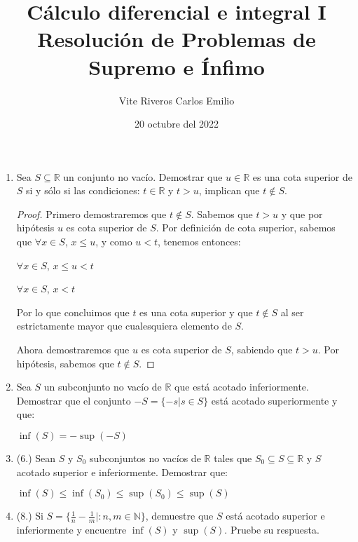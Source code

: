 \documentclass[11pt, a4paper]{article}
\title{Cálculo diferencial e integral I\\Resolución de Problemas de Supremo e Ínfimo}
\author{Vite Riveros Carlos Emilio}
\date{20 octubre del 2022}
\begin{document}
    \maketitle
    \begin{enumerate}
        \item Sea $S \subseteq \mathbb{R}$ un conjunto no vacío. Demostrar que $u \in \mathbb{R}$ es una cota superior de $S$ si y sólo si las
        condiciones: $t \in \mathbb{R}$ y $t > u$, implican que $t \notin S$.

        \begin{proof}
            Primero demostraremos que $t \notin S$. Sabemos que $t > u$ y que por hipótesis $u$ es cota superior de $S$.
            Por definición de cota superior, sabemos que $\forall x \in S$, $x \leq u$, y como $u<t$, tenemos entonces:
            \begin{center}
                $\forall x \in S$, $x\leq u < t$

                $\forall x \in S$, $x < t$
            \end{center}

            Por lo que concluimos que $t$  es una cota superior y que $t \notin S$ al ser estrictamente mayor que cualesquiera elemento de $S$.

            Ahora demostraremos que $u$ es cota superior de $S$, sabiendo que $t>u$. Por hipótesis, sabemos que $t \notin S$.


        \end{proof}

        \item Sea $S$ un subconjunto no vacío de $\mathbb{R}$ que está acotado inferiormente. Demostrar que el conjunto
        $-S = \{-s | s \in S\}$ está acotado superiormente y que:
        \begin{center}
            $\inf(S)=-\sup(-S)$
        \end{center}

        \item (6.)  Sean $S$ y $S_0$ subconjuntos no vacíos de $\mathbb{R}$ tales que $S_0 \subseteq S \subseteq \mathbb{R}$ y $S$ acotado superior e inferiormente.
        Demostrar que:

        \begin{center}
            $\inf(S)\leq\inf(S_0)\leq\sup(S_0)\leq\sup(S)$
        \end{center}

        \item (8.) Si $S = \{\frac{1}{n}-\frac{1}{m}|:n,m \in \mathbb{N}\}$, demuestre que $S$ está acotado superior e inferiormente y encuentre $\inf(S)$
        y $\sup(S)$. Pruebe su respuesta.
    \end{enumerate}
\end{document}
